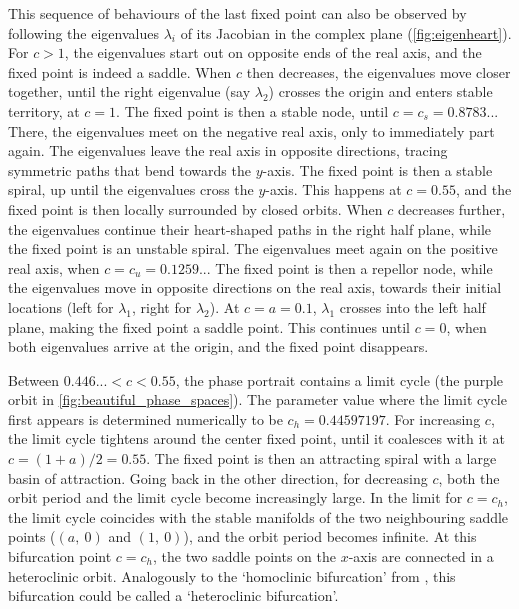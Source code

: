 This sequence of behaviours of the last fixed point can also be observed by following the eigenvalues $\lambda_i$ of its Jacobian in the complex plane (\cref{fig:eigenheart}). For $c > 1$, the eigenvalues start out on opposite ends of the real axis, and the fixed point is indeed a saddle. When $c$ then decreases, the eigenvalues move closer together, until the right eigenvalue (say $\lambda_2$) crosses the origin and enters stable territory, at $c = 1$. The fixed point is then a stable node, until $c = c_s = 0.8783..$. There, the eigenvalues meet on the negative real axis, only to immediately part again. The eigenvalues leave the real axis in opposite directions, tracing symmetric paths that bend towards the $y$-axis. The fixed point is then a stable spiral, up until the eigenvalues cross the $y$-axis. This happens at $c = 0.55$, and the fixed point is then locally surrounded by closed orbits. When $c$ decreases further, the eigenvalues continue their heart-shaped paths in the right half plane, while the fixed point is an unstable spiral. The eigenvalues meet again on the positive real axis, when $c = c_u = 0.1259..$. The fixed point is then a repellor node, while the eigenvalues move in opposite directions on the real axis, towards their initial locations (left for $\lambda_1$, right for $\lambda_2$). At $c = a = 0.1$, $\lambda_1$ crosses into the left half plane, making the fixed point a saddle point. This continues until $c = 0$, when both eigenvalues arrive at the origin, and the fixed point disappears.

Between $0.446... < c < 0.55$, the phase portrait contains a limit cycle (the purple orbit in \cref{fig:beautiful_phase_spaces}). The parameter value where the limit cycle first appears is determined numerically to be $c_h =0.44597197$. For increasing $c$, the limit cycle tightens around the center fixed point, until it coalesces with it at $c = (1+a)/2 = 0.55$. The fixed point is then an attracting spiral with a large basin of attraction. Going back in the other direction, for decreasing $c$, both the orbit period and the limit cycle become increasingly large. In the limit for $c = c_h$, the limit cycle coincides with the stable manifolds of the two neighbouring saddle points ($(a,\ 0)$ and $(1,\ 0)$), and the orbit period becomes infinite. At this bifurcation point $c = c_h$, the two saddle points on the $x$-axis are connected in a heteroclinic orbit. Analogously to the `homoclinic bifurcation' from , this bifurcation could be called a `heteroclinic bifurcation'.
